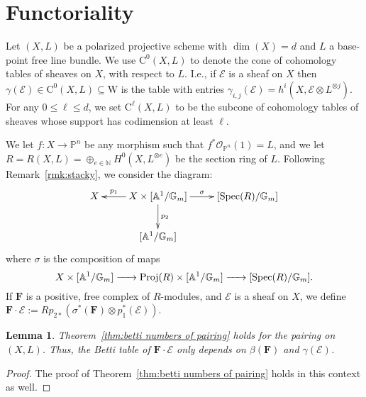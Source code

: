 \documentclass[12pt]{amsart}
\newtheorem{lemma}{Lemma}[section]
\theoremstyle{definition}
\theoremstyle{remark}
\newcommand{\Spec}{\operatorname{Spec}}
\newcommand{\Proj}{\operatorname{Proj}}
\newcommand{\kk}{\Bbbk}
\newcommand{\PP}{\mathbb{P}}
\renewcommand{\AA}{\mathbb{A}}
\newcommand{\GG}{\mathbb{G}}
\newcommand{\WW}{\mathrm{W}}
\newcommand{\cO}{\mathcal{O}}
\newcommand{\cE}{\mathcal{E}}
\newcommand{\FF}{\mathbf{F}}
\newcommand{\CQ}{\mathrm{C}}
\begin{document}
\section{Functoriality}\label{sec:functor}
Let $(X,L)$ be a polarized projective scheme with $\dim(X)=d$ and $L$ a base-point free line bundle.  We use $\CQ^{0}(X,L)$ to denote the cone of cohomology tables of sheaves on $X$, with respect to $L$.  I.e., if $\cE$ is a sheaf on $X$ then $\gamma(\cE)\in \CQ^0(X,L)\subseteq \WW$ is the table with entries $\gamma_{i,j}(\cE)=h^i(X,\cE\otimes L^{\otimes j})$.  For any $0\leq \ell \leq d$, we set $\CQ^{\ell}(X,L)$ to be the subcone of cohomology tables of sheaves whose support has codimension at least $\ell$.

We let $f\colon X\to \PP^n$ be any morphism such that $f^*\cO_{\PP^n}(1)=L$, and we let $R=R(X,L)=\oplus_{e\in \mathbb N} H^0(X,L^{\otimes e})$ be the section ring of $L$.  Following Remark~\ref{rmk:stacky}, we consider the diagram:
\[
\xymatrix{
X&X\times [\AA^1/\GG_m]\ar[l]_-{p_1} \ar[r]^-\sigma \ar[d]^{p_2}&[\Spec(R)/\GG_m]\\
&[\AA^1/\GG_m]&%
}
\]
where $\sigma$ is the composition of maps
\[
X\times [\AA^1/\GG_m]\xrightarrow{\hspace*{.5cm}}\Proj(R)\times [\AA^1/\GG_m]\xrightarrow{\hspace*{.5cm}} [\Spec(R)/\GG_m].
\]
If $\FF$ is a positive, free complex of $R$-modules, and $\cE$ is a sheaf on $X$, we define $\FF\cdot \cE:=Rp_{2*}(\sigma^*(\FF)\otimes p_1^*(\cE))$.

\begin{lemma}\label{lem:betti nums genl}
Theorem~\ref{thm:betti numbers of pairing} holds for the pairing on $(X,L)$.  Thus, the Betti table of $\FF\cdot \cE$ only depends on $\beta(\FF)$ and $\gamma(\cE)$.
\end{lemma}
\begin{proof}
The proof of Theorem~\ref{thm:betti numbers of pairing} holds in this context as well.
\end{proof}

\end{document}
